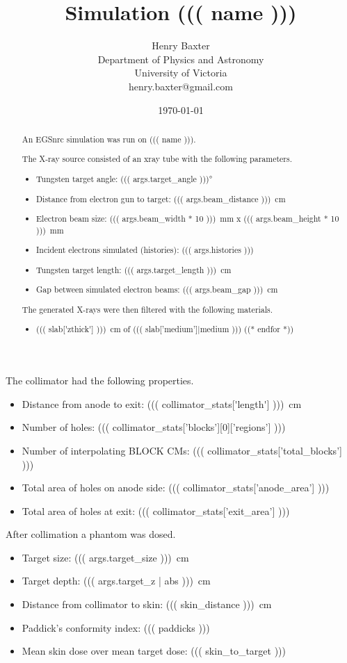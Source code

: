 \documentclass[12pt]{article}
\title{Simulation ((( name )))}
\author{
        Henry Baxter \\
                Department of Physics and Astronomy\\
        University of Victoria\\
        henry.baxter@gmail.com
}
\date{\today}
\begin{document}
\maketitle

\begin{abstract}
An EGSnrc simulation was run on ((( name ))).

The X-ray source consisted of an xray tube with the following parameters.
\begin{itemize}
	\item Tungsten target angle: \ang{((( args.target_angle )))}
	\item Distance from electron gun to target: \SI{((( args.beam_distance )))}{\cm}
	\item Electron beam size: \SI{((( args.beam_width * 10 )))}{\mm} x \SI{((( args.beam_height * 10 )))}{\mm}
	\item Incident electrons simulated (histories): ((( args.histories )))
	\item Tungsten target length: \SI{((( args.target_length )))}{\cm}
	\item Gap between simulated electron beams: \SI{((( args.beam_gap )))}{\cm}
\end{itemize}

The generated X-rays were then filtered with the following materials.
\begin{itemize}
	((* for slab in _filter['cms'][0]['slabs'] *))
	\item \SI{((( slab['zthick'] )))}{\cm} of ((( slab['medium']|medium )))
	((* endfor *))
\end{itemize}
\end{abstract}

The collimator had the following properties.
\begin{itemize}
	\item Distance from anode to exit: \SI{((( collimator_stats['length'] )))}{\cm}
	\item Number of holes: ((( collimator_stats['blocks'][0]['regions'] )))
	\item Number of interpolating BLOCK CMs: ((( collimator_stats['total_blocks'] )))
	\item Total area of holes on anode side: ((( collimator_stats['anode_area'] )))
	\item Total area of holes at exit: ((( collimator_stats['exit_area'] )))
\end{itemize}

After collimation a phantom was dosed.
\begin{itemize}
	\item Target size: \SI{((( args.target_size )))}{\cm}
	\item Target depth: \SI{((( args.target_z | abs )))}{\cm}
	\item Distance from collimator to skin: \SI{((( skin_distance )))}{\cm}
	\item Paddick's conformity index: ((( paddicks )))
	\item Mean skin dose over mean target dose: ((( skin_to_target )))
\end{itemize}
\end{document}
